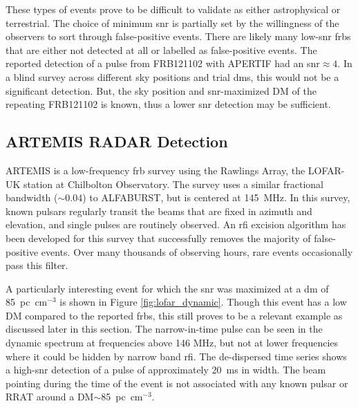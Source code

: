 \documentclass[a4paper,fleqn,usenatbib]{mnras}
\begin{document}
These types of events prove to be difficult to validate as either astrophysical
or terrestrial. The choice of minimum \gls{snr} is partially set by the
willingness of the observers to sort through false-positive events.  There are
likely many low-\gls{snr} \glspl{frb} that are either not detected at all or
labelled as false-positive events.  The reported detection of a pulse from
FRB121102 with APERTIF \citep{atel10693} had an \gls{snr}$\approx 4$. In a blind
survey across different sky positions and trial \glspl{dm}, this would not be a
significant detection.  But, the sky position and \gls{snr}-maximized DM of the
repeating FRB121102 is known, thus a lower \gls{snr} detection may be
sufficient.

\subsection{ARTEMIS RADAR Detection}
\label{sec:LOFAR_RADAR}

ARTEMIS \citep{2015MNRAS.452.1254K} is a low-frequency \gls{frb} survey using
the Rawlings Array, the LOFAR-UK station at Chilbolton Observatory.  The survey
uses a similar fractional bandwidth ($\sim 0.04$) to ALFABURST, but is centered
at 145~MHz.  In this survey, known pulsars regularly transit the beams that are
fixed in azimuth and elevation, and single pulses are routinely observed.  An
\gls{rfi} excision algorithm has been developed for this survey that
successfully removes the majority of false-positive events. Over many thousands
of observing hours, rare events occasionally pass this filter.

A particularly interesting event for which the \gls{snr} was maximized at a
\gls{dm} of 85~pc~cm$^{-3}$ is shown in Figure \ref{fig:lofar_dynamic}. Though
this event has a low DM compared to the reported \glspl{frb}, this still proves
to be a relevant example as discussed later in this section.  The narrow-in-time
pulse can be seen in the dynamic spectrum at frequencies above 146 MHz, but not
at lower frequencies where it could be hidden by narrow band \gls{rfi}.  The
de-dispersed time series shows a high-\gls{snr} detection of a pulse of
approximately 20~ms in width.  The beam pointing during the time of the event is
not associated with any known pulsar or RRAT around a DM$\sim$85~pc~cm$^{-3}$.
\end{document}
